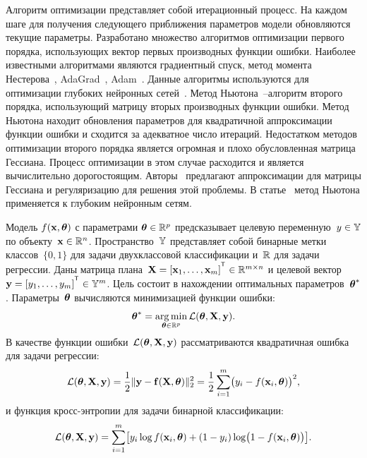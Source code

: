 Алгоритм оптимизации представляет собой итерационный процесс.
На каждом шаге для получения следующего приближения параметров модели обновляются текущие параметры.
Разработано множество алгоритмов оптимизации первого порядка, использующих вектор первых производных функции ошибки.
Наиболее известными алгоритмами являются градиентный спуск, 
метод момента Нестерова~\cite{nesterov1983momentum}, AdaGrad~\cite{duchi2011adagrad}, Adam~\cite{kingma2014adam}.
Данные алгоритмы используются для оптимизации глубоких нейронных сетей~\cite{goodfellow2016deeplearningbook}.
Метод Ньютона~--алгоритм второго порядка, использующий матрицу вторых производных функции ошибки.
Метод Ньютона находит обновления параметров для квадратичной аппроксимации функции ошибки и сходится за адекватное число итераций.
Недостатком методов оптимизации второго порядка является огромная и плохо обусловленная матрица Гессиана.
Процесс оптимизации в этом случае расходится и является вычислительно дорогостоящим.
Авторы~\cite{avriel2003nonlinear,blaschke1997convergence} предлагают аппроксимации для матрицы Гессиана и регуляризацию для решения этой проблемы.
В статье~\cite{botev2017newtondeeplearning} метод Ньютона применяется к глубоким нейронным сетям.

Модель $f( \mathbf{x}, \boldsymbol{\theta})$ с параметрами $\boldsymbol{\theta} \in \mathbb{R}^p$ предсказывает целевую переменную~$y \in \mathbb{Y}$ по объекту~$\mathbf{x} \in \mathbb{R}^{n}$. Пространство~$\mathbb{Y}$ представляет собой бинарные метки классов~$\{0, 1\}$ для задачи двухклассовой классификации и~$\mathbb{R}$ для задачи регрессии.
Даны матрица плана~$\bX = [\bx_1, \dots, \bx_m]^{\T} \in \bbR^{m \times n}$ и целевой вектор~$\by = [y_1, \dots, y_m]^{\T} \in \bbY^{m}$. 
Цель состоит в нахождении оптимальных параметров~$\boldsymbol{\theta}^*$.
Параметры~$\boldsymbol{\theta}$ вычисляются минимизацией функции ошибки:
\begin{equation}
\boldsymbol{\theta}^* = \mathop{\arg \min}\limits_{\boldsymbol{\theta} \in \mathbb{R}^p} \mathcal{L}(\boldsymbol{\theta}, \mathbf{X}, \mathbf{y}).
\label{ch3:eq:error_function}
\end{equation}
В качестве функции ошибки~$\mathcal{L} (\boldsymbol{\theta}, \mathbf{X}, \mathbf{y})$ рассматриваются квадратичная ошибка для задачи регрессии:
\begin{equation}
\mathcal{L}(\boldsymbol{\theta}, \mathbf{X}, \mathbf{y}) = \frac 12 \| \mathbf{y} - \mathbf{f}(\mathbf{X}, \boldsymbol{\theta}) \|_2^2 = \frac 12 \sum_{i=1}^m \bigl( y_i - f(\mathbf{x}_i,  \boldsymbol{\theta})\bigr)^2,
\label{ch3:eq:squared_error}
\end{equation}
и функция кросс-энтропии для задачи бинарной классификации: 
\begin{equation}
\mathcal{L}(\boldsymbol{\theta}, \mathbf{X}, \mathbf{y}) = \sum_{i=1}^m \bigl[y_i \log f (\mathbf{x}_i , \boldsymbol{\theta}) + (1-y_i) \log \bigl(1 - f (\mathbf{x}_i , \boldsymbol{\theta})\bigr)\bigr].
\label{ch3:eq:log_loss}
\end{equation}

